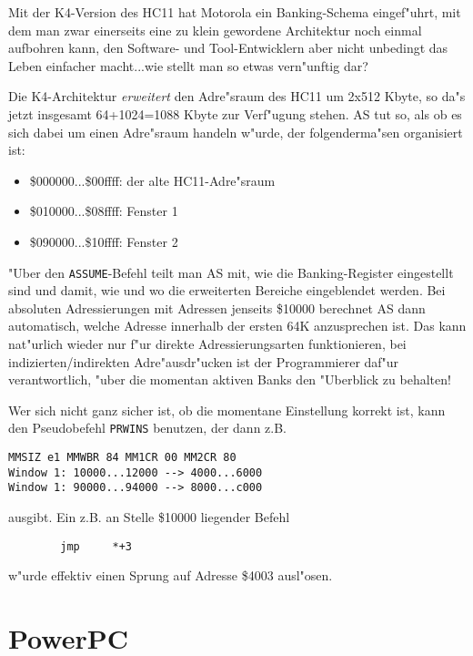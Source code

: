 \documentclass[12pt,a4paper,twoside]{report}
\begin{document}
Mit der K4-Version des HC11 hat Motorola ein Banking-Schema eingef"uhrt,
mit dem man zwar einerseits eine zu klein gewordene Architektur noch
einmal aufbohren kann, den Software- und Tool-Entwicklern aber nicht
unbedingt das Leben einfacher macht...wie stellt man so etwas vern"unftig
dar?

Die K4-Architektur {\em erweitert} den Adre"sraum des HC11 um 2x512 Kbyte,
so da"s jetzt insgesamt 64+1024=1088 Kbyte zur Verf"ugung stehen.  AS tut
so, als ob es sich dabei um einen Adre"sraum handeln w"urde, der
folgenderma"sen organisiert ist:
\begin{itemize}
\item{\$000000...\$00ffff: der alte HC11-Adre"sraum}
\item{\$010000...\$08ffff: Fenster 1}
\item{\$090000...\$10ffff: Fenster 2}
\end{itemize}
"Uber den {\tt ASSUME}-Befehl teilt man AS mit, wie die Banking-Register
eingestellt sind und damit, wie und wo die erweiterten Bereiche
eingeblendet werden.  Bei absoluten Adressierungen mit Adressen jenseits
\$10000 berechnet AS dann automatisch, welche Adresse innerhalb der ersten
64K anzusprechen ist.  Das kann nat"urlich wieder nur f"ur direkte
Adressierungsarten funktionieren, bei indizierten/indirekten
Adre"ausdr"ucken ist der Programmierer daf"ur verantwortlich, "uber die
momentan aktiven Banks den "Uberblick zu behalten!

Wer sich nicht ganz sicher ist, ob die momentane Einstellung korrekt ist,
kann den Pseudobefehl {\tt PRWINS} benutzen, der dann z.B.
\begin{verbatim}
MMSIZ e1 MMWBR 84 MM1CR 00 MM2CR 80
Window 1: 10000...12000 --> 4000...6000
Window 1: 90000...94000 --> 8000...c000
\end{verbatim}
ausgibt.  Ein z.B. an Stelle \$10000 liegender Befehl
\begin{verbatim}
        jmp     *+3
\end{verbatim}
w"urde effektiv einen Sprung auf Adresse \$4003 ausl"osen.


\section{PowerPC}
\end{document}
